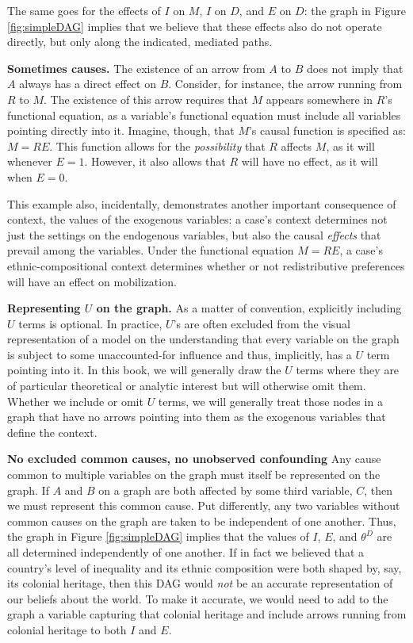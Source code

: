 \documentclass[
  12pt,
]{book}
\begin{document}
The same goes for the effects of \(I\) on \(M\), \(I\) on \(D\), and \(E\) on \(D\): the graph in Figure \ref{fig:simpleDAG} implies that we believe that these effects also do not operate directly, but only along the indicated, mediated paths.

\textbf{Sometimes causes.} The existence of an arrow from \(A\) to \(B\) does not imply that \(A\) always has a direct effect on \(B\). Consider, for instance, the arrow running from \(R\) to \(M\). The existence of this arrow requires that \(M\) appears somewhere in \(R\)'s functional equation, as a variable's functional equation must include all variables pointing directly into it. Imagine, though, that \(M\)'s causal function is specified as: \(M = RE\). This function allows for the \emph{possibility} that \(R\) affects \(M\), as it will whenever \(E=1\). However, it also allows that \(R\) will have no effect, as it will when \(E=0\).

This example also, incidentally, demonstrates another important consequence of context, the values of the exogenous variables: a case's context determines not just the settings on the endogenous variables, but also the causal \emph{effects} that prevail among the variables. Under the functional equation \(M=RE\), a case's ethnic-compositional context determines whether or not redistributive preferences will have an effect on mobilization.

\textbf{Representing \(U\) on the graph.} As a matter of convention, explicitly including \(U\) terms is optional. In practice, \(U\)'s are often excluded from the visual representation of a model on the understanding that every variable on the graph is subject to some unaccounted-for influence and thus, implicitly, has a \(U\) term pointing into it. In this book, we will generally draw the \(U\) terms where they are of particular theoretical or analytic interest but will otherwise omit them. Whether we include or omit \(U\) terms, we will generally treat those nodes in a graph that have no arrows pointing into them as the exogenous variables that define the context.

\textbf{No excluded common causes, no unobserved confounding} Any cause common to multiple variables on the graph must itself be represented on the graph. If \(A\) and \(B\) on a graph are both affected by some third variable, \(C\), then we must represent this common cause. Put differently, any two variables without common causes on the graph are taken to be independent of one another. Thus, the graph in Figure \ref{fig:simpleDAG} implies that the values of \(I\), \(E\), and \(\theta^D\) are all determined independently of one another. If in fact we believed that a country's level of inequality and its ethnic composition were both shaped by, say, its colonial heritage, then this DAG would \emph{not} be an accurate representation of our beliefs about the world. To make it accurate, we would need to add to the graph a variable capturing that colonial heritage and include arrows running from colonial heritage to both \(I\) and \(E\).
\end{document}
